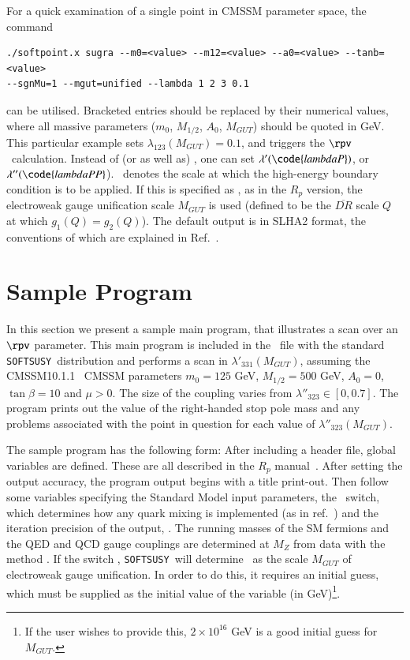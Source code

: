 \documentclass[final,3p,times,pdflatex]{elsarticle}
\def\SOFTSUSY{{\tt SOFTSUSY}}
\begin{document}
For a quick examination of a single point in CMSSM parameter space, the
command  
\small
\begin{verbatim}
./softpoint.x sugra --m0=<value> --m12=<value> --a0=<value> --tanb=<value>
--sgnMu=1 --mgut=unified --lambda 1 2 3 0.1
\end{verbatim}
\normalsize
can be utilised. Bracketed entries should be replaced by their numerical
values, where all massive parameters ($m_0$, $M_{1/2}$, $A_0$, $M_{GUT}$)
should be 
quoted in GeV. This particular example sets $\lambda_{123}(M_{GUT})=0.1$, and
triggers the $\rpv$~calculation. Instead of (or as well as)
, one can set $\lambda'(\code{lambdaP})$, or
$\lambda''(\code{lambdaPP}$). 
~denotes the scale at which the high-energy boundary condition is to
be applied. 
If this is 
specified as , as in the $R_p$ version, the electroweak gauge
unification scale
$M_{GUT}$ is used (defined to be the $\overline{DR}$ scale $Q$ at which $g_1(Q) =
g_2(Q)$). The default output is in SLHA2 format, the conventions of which are
explained in Ref.~\cite{Allanach:2008qq}. 


\section{Sample Program \label{sec:prog}}

In this section we present a sample main program, that illustrates 
a scan over an $\rpv$ parameter. This main program
is included in the  
~file with the standard \SOFTSUSY~distribution and performs
a scan in $\lambda'_{331}(M_{GUT})$, assuming the CMSSM10.1.1~\cite{bench}
CMSSM parameters $m_0=125$ GeV, $M_{1/2}=500$ GeV, $A_0=0$, $\tan
\beta=10$ and $\mu>0$. The  
size of the coupling varies from $\lambda''_{323} \in [0 , 0.7 ]$.
The program prints out the value of the right-handed stop pole mass and any
problems 
associated with the point in question for each value of
$\lambda''_{323}(M_{GUT})$. 

The sample program has the following form: 
\small
\normalsize
After including a header file, global variables are defined. These are all
described in the $R_p$ manual~\cite{Allanach:2001kg}.
After setting the output accuracy, 
the program output begins with a title print-out. Then follow
some variables specifying the Standard Model input parameters, the
~switch, which determines how any quark mixing is implemented
(as in ref.~\cite{Allanach:2001kg}) and
the iteration precision of the output, .
The running masses of the SM fermions and the QED and QCD gauge couplings are
determined at $M_Z$ from data with the method .
If the switch , \SOFTSUSY~will
determine ~as the scale $M_{GUT}$ of electroweak gauge
unification. In order to do 
this, it requires an initial guess, which must be 
supplied as the initial value of the variable  (in
GeV)\footnote{If the user wishes to provide 
  this, $2 \times 10^{16}$ GeV is a good initial
guess for $M_{GUT}$.}.
\end{document}
